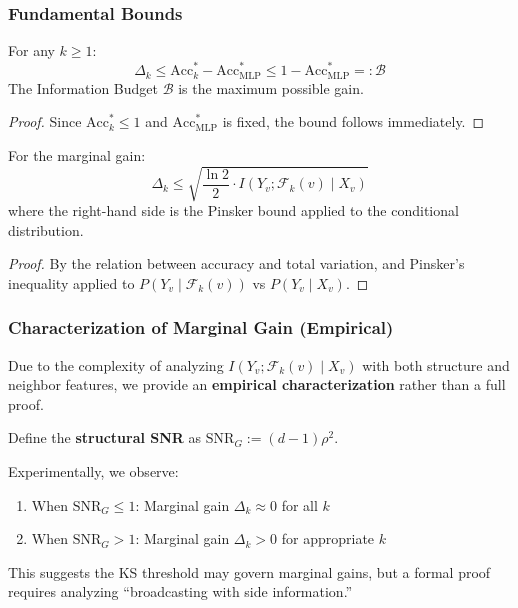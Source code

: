 \subsubsection{Fundamental Bounds}

\begin{theorem}
\label{thm:marginal_gain_upper}
For any $k \geq 1$:
\begin{equation}
    \Delta_k \leq \mathrm{Acc}_{k}^* - \mathrm{Acc}_{\mathrm{MLP}}^* \leq 1 - \mathrm{Acc}_{\mathrm{MLP}}^* =: \mathcal{B}
\end{equation}
The Information Budget $\mathcal{B}$ is the maximum possible gain.
\end{theorem}

\begin{proof}
Since $\mathrm{Acc}_{k}^* \leq 1$ and $\mathrm{Acc}_{\mathrm{MLP}}^*$ is fixed, the bound follows immediately.
\end{proof}

\begin{theorem}
\label{thm:cmi_bound}
For the marginal gain:
\begin{equation}
    \Delta_k \leq \sqrt{\frac{\ln 2}{2} \cdot I(Y_v; \mathcal{F}_k(v) \mid X_v)}
\end{equation}
where the right-hand side is the Pinsker bound applied to the conditional distribution.
\end{theorem}

\begin{proof}
By the relation between accuracy and total variation, and Pinsker's inequality applied to $P(Y_v \mid \mathcal{F}_k(v))$ vs $P(Y_v \mid X_v)$.
\end{proof}

\subsubsection{Characterization of Marginal Gain (Empirical)}

Due to the complexity of analyzing $I(Y_v; \mathcal{F}_k(v) \mid X_v)$ with both structure and neighbor features, we provide an \textbf{empirical characterization} rather than a full proof.

\begin{observation}
\label{obs:snr_marginal}
Define the \textbf{structural SNR} as $\mathrm{SNR}_G := (d-1)\rho^2$.

Experimentally, we observe:
\begin{enumerate}
    \item When $\mathrm{SNR}_G \leq 1$: Marginal gain $\Delta_k \approx 0$ for all $k$
    \item When $\mathrm{SNR}_G > 1$: Marginal gain $\Delta_k > 0$ for appropriate $k$
\end{enumerate}
This suggests the KS threshold may govern marginal gains, but a formal proof requires analyzing ``broadcasting with side information.''
\end{observation}

